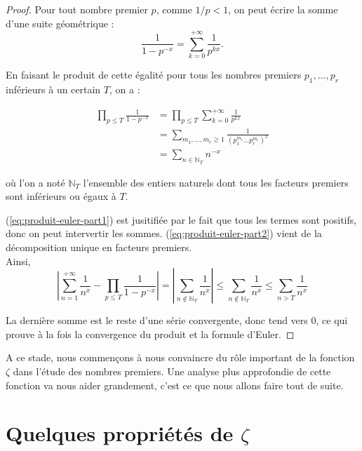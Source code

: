 \documentclass[french]{report}
\begin{document}
\begin{proof}
  Pour tout nombre premier $p$, comme $1/p<1$, on peut écrire la somme d'une suite géométrique :
  \[ \frac{1}{1-p^{-x}}=\sum_{k=0}^{+\infty}\frac{1}{p^{kx}}. \]

  En faisant le produit de cette égalité pour tous les nombres premiers $p_1, ..., p_r$ inférieurs à un certain $T$, on a :
  
  \begin{align}
    \prod_{p\leq T}\frac{1}{1-p^{-x}}
    &= \prod_{p\leq T}\sum_{k=0}^{+\infty}\frac{1}{p^{kx}}  \\
    &= \sum_{m_1,...,m_r\geq1}\frac{1}{(p_1^{m_1}...p_r^{m_r})^x} \label{eq:produit-euler-part1} \\
    &= \sum_{n\in\mathbb{N}_T}n^{-x} \label{eq:produit-euler-part2}
  \end{align}

  où l'on a noté $\mathbb{N}_T$ l'ensemble des entiers naturels dont tous les facteurs premiers sont inférieurs ou égaux à $T$.

  (\ref{eq:produit-euler-part1}) est jusitifiée par le fait que tous les termes sont positifs, donc on peut intervertir les sommes. (\ref{eq:produit-euler-part2}) vient de la décomposition unique en facteurs premiers.
  \\

  Ainsi,
  \[ \left|\sum_{n=1}^{+\infty}\frac{1}{n^x}-\prod_{p\leq T}\frac{1}{1-p^{-x}}\right|
  = \left|\sum_{n\notin\mathbb{N}_T}\frac{1}{n^x}\right|
  \leq \sum_{n\notin\mathbb{N}_T}\frac{1}{n^x}
  \leq \sum_{n>T}\frac{1}{n^x}
  \]

  La dernière somme est le reste d'une série convergente, donc tend vers 0, ce qui prouve à la fois la convergence du produit et la formule d'Euler.
\end{proof}

A ce stade, nous commençons à nous convaincre du rôle important de la fonction $\zeta$ dans l'étude des nombres premiers. Une analyse plus approfondie de cette fonction va nous aider grandement, c'est ce que nous allons faire tout de suite.

\section{Quelques propriétés de $\zeta$}
\end{document}
